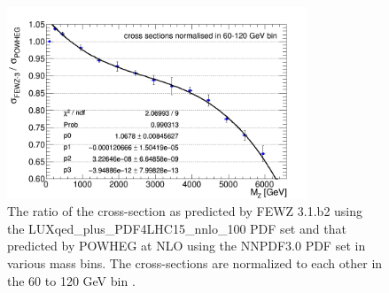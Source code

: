 \begin{figure}[bh]
\begin{center}
\includegraphics[angle=0,width=0.8\textwidth]{figures/Zprime/2016/zPeakDY/powhegFEWZKFactor.png}
\end{center}
\caption{
The ratio of the \zee cross-section as predicted by FEWZ 3.1.b2 using the LUXqed\_plus\_PDF4LHC15\_nnlo\_100 PDF set and that predicted by
POWHEG at NLO using the NNPDF3.0 PDF set in various mass bins. The cross-sections are normalized to each other in the 60 to 120 GeV bin \cite{CMS-AN-2016-404}.
}
\label{fig:fewzPowheg}
\end{figure}



